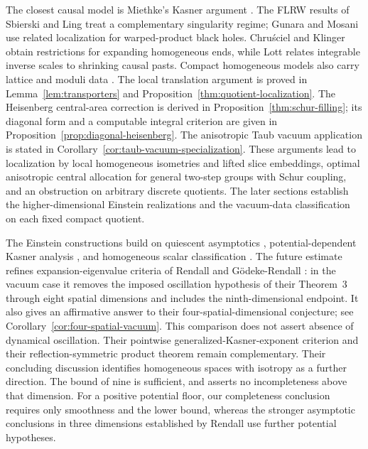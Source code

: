 \documentclass[10pt,a4paper]{article}
\numberwithin{equation}{section}
\theoremstyle{definition}
\theoremstyle{remark}
\begin{document}
The closest causal model is Miethke's Kasner argument
\cite{Miethke2024}.  The FLRW results of Sbierski and Ling
\cite{SbierskiFLRW,LingFLRW} treat a complementary singularity regime;
Gunara \cite{Gunara2026} and Mosani \cite{Mosani2026} use related localization for warped-product
black holes.  Chru\'sciel and Klinger \cite{ChruscielKlinger2018} obtain
restrictions for expanding homogeneous ends, while Lott
\cite[Proposition~13 and Example~6]{Lott2020} relates integrable inverse
scales to shrinking causal pasts.  Compact homogeneous models also carry
lattice and moduli data
\cite{KoikeTanimotoHosoya1994,TanimotoKoikeHosoya1997}.
The local translation argument is proved in
Lemma~\ref{lem:transporters} and
Proposition~\ref{thm:quotient-localization}.  The Heisenberg central-area
correction is derived in Proposition~\ref{thm:schur-filling}; its diagonal
form and a computable integral criterion are given in
Proposition~\ref{prop:diagonal-heisenberg}.  The anisotropic Taub vacuum
application is stated in Corollary~\ref{cor:taub-vacuum-specialization}.
These arguments lead to localization by local homogeneous isometries and
lifted slice embeddings, optimal anisotropic central allocation for
general two-step groups with Schur coupling, and an obstruction on
arbitrary discrete quotients.  The later sections establish the
higher-dimensional Einstein realizations and the vacuum-data
classification on each fixed compact quotient.

The Einstein constructions build on quiescent asymptotics
\cite{AnderssonRendall2001}, potential-dependent Kasner analysis
\cite{Ritchie2022}, and homogeneous scalar classification
\cite{Ringstrom2025}.  The future estimate refines expansion-eigenvalue
criteria of Rendall and G\"odeke-Rendall
\cite{Rendall1995Matter,GoedekeRendall2010}: in the vacuum case it removes
the imposed oscillation hypothesis of their Theorem~3 through eight
spatial dimensions and includes the ninth-dimensional endpoint.  It also
gives an affirmative answer to their four-spatial-dimensional conjecture;
see Corollary~\ref{cor:four-spatial-vacuum}.  This comparison does not
assert absence of dynamical oscillation.  Their pointwise
generalized-Kasner-exponent criterion and their reflection-symmetric
product theorem remain complementary.  Their concluding discussion
identifies homogeneous spaces with isotropy as a further direction.
The bound of nine is sufficient, and asserts no incompleteness above
that dimension.  For a positive potential floor, our completeness
conclusion requires only smoothness and the lower bound, whereas the
stronger asymptotic conclusions in three dimensions established by
Rendall \cite[Theorems~1-2]{Rendall2004Scalar} use further potential
hypotheses.
\end{document}
